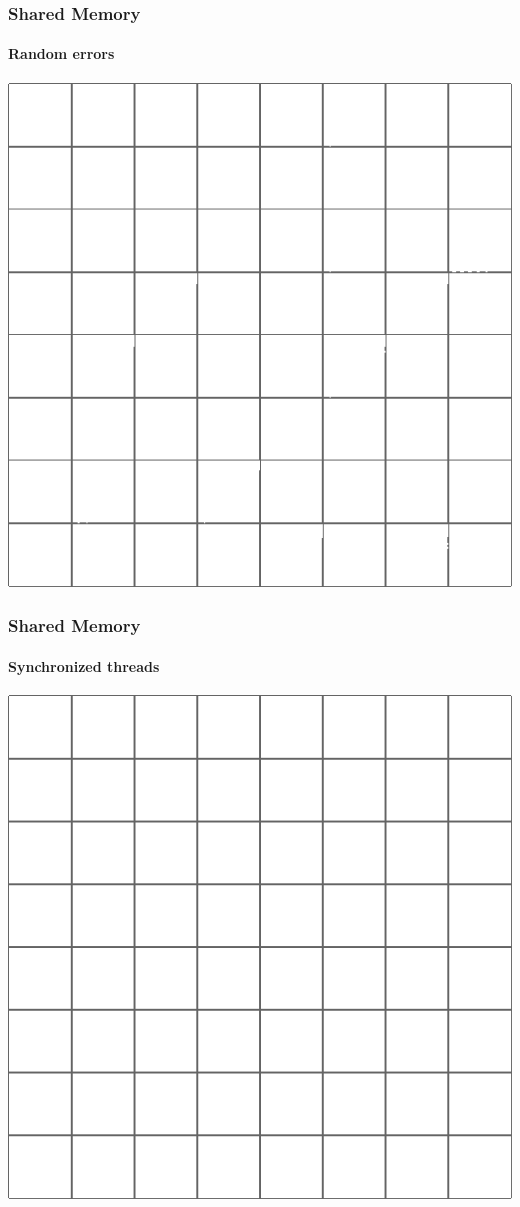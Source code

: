 \begin{frame}
\frametitle{Shared Memory}
\framesubtitle{Random errors}
\begin{center}
\includegraphics[scale=0.4]{../check/borders_1c_01.png}
\end{center}
\end{frame}


\begin{frame}
\frametitle{Shared Memory}
\framesubtitle{Synchronized threads}
\begin{center}
\includegraphics[scale=0.4]{../check/borders_sync.png}
\end{center}
\end{frame}